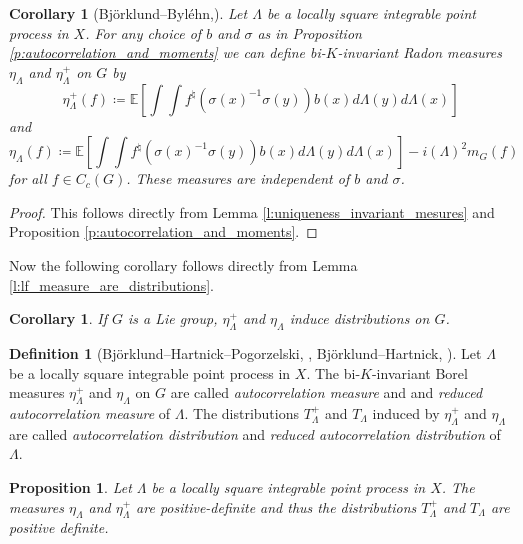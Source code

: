 \documentclass[12pt,reqno,a4paper]{amsart}
\theoremstyle{theorem}
\newtheorem{proposition}[theorem]{Proposition}
\newtheorem{corollary}[theorem]{Corollary}
\theoremstyle{definition}
\newtheorem{definition}[theorem]{Definition}
\numberwithin{theorem}{section}
\numberwithin{equation}{section}
\begin{document}
\begin{corollary}[Björklund--Byléhn,\cite{MichaelMattiasArXiv}]
	Let $\Lambda$ be a locally square integrable point process in $X$.
	For any choice of $b$ and $\sigma$ as in Proposition \ref{p:autocorrelation_and_moments} we can define bi-$K$-invariant Radon measures $\eta_\Lambda$ and $\eta_\Lambda^+$ on $G$ by
	\[
	\eta_\Lambda^+(f)\coloneqq \mathbb{E}\left[\int \int f^\natural(\sigma(x)^{-1}\sigma(y))b(x)d\Lambda(y)d\Lambda(x)\right]
	\]
	and
	\[
	\eta_\Lambda(f)\coloneqq \mathbb{E}\left[\int \int f^\natural(\sigma(x)^{-1}\sigma(y))b(x)d\Lambda(y)d\Lambda(x)\right] -i(\Lambda)^2m_G(f)
	\]
	for all $f\in C_c(G)$. These measures are independent of $b$ and $\sigma$.
\end{corollary}
\begin{proof}
	This follows directly from Lemma \ref{l:uniqueness_invariant_mesures} and Proposition \ref{p:autocorrelation_and_moments}.
\end{proof}
Now the following corollary follows directly from Lemma \ref{l:lf_measure_are_distributions}.
\begin{corollary}\label{c:autocorrelation_distributions_exist}
	If $G$ is a Lie group, $\eta_\Lambda^+$ and $\eta_\Lambda$ induce distributions on $G$.
\end{corollary}
\begin{definition}[Björklund--Hartnick--Pogorzelski, \cite{BHP2}, Björklund--Hartnick, \cite{BjorklundHartnickHyperuniformity}]
	Let $\Lambda$ be a locally square integrable point process in $X$. The bi-$K$-invariant Borel measures $\eta_\Lambda^+$ and $\eta_\Lambda$ on $G$ are called \emph{autocorrelation measure} and and \emph{reduced autocorrelation measure} of $\Lambda$.
	The distributions $T_\Lambda^+$ and $T_\Lambda$ induced by $\eta_\Lambda^+$ and $\eta_\Lambda$ are called \emph{autocorrelation distribution} and \emph{reduced autocorrelation distribution} of $\Lambda$.
\end{definition}
\begin{proposition}
	Let $\Lambda$ be a locally square integrable point process in $X$.
	The measures $\eta_\Lambda$ and $\eta_\Lambda^+$ are positive-definite and thus the distributions $T_\Lambda^+$ and $T_\Lambda$ are positive definite.
\end{proposition}
\end{document}
